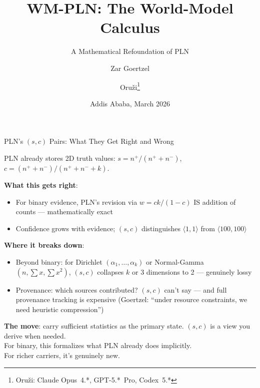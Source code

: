 \documentclass[aspectratio=169,11pt]{beamer}
\title{WM-PLN: The World-Model Calculus}
\subtitle{A Mathematical Refoundation of PLN}
\author{Zar Goertzel \and Oru\v{z}i\thanks{%
  Oru\v{z}i: Claude Opus~4.*, GPT-5.*~Pro, Codex~5.*}}
\institute{Hyperon AGI Community Meeting}
\date{Addis Ababa, March 2026}
\begin{document}
\begin{frame}
\titlepage
\end{frame}

\begin{frame}{PLN's $(s, c)$ Pairs: What They Get Right and Wrong}

PLN already stores 2D truth values: $s = n^+/(n^+ + n^-)$,
$c = (n^+ + n^-)/(n^+ + n^- + k)$.

\medskip
\textbf{What this gets right}:
\begin{itemize}
\item For binary evidence, PLN's revision via $w = ck/(1{-}c)$
      IS addition of counts --- mathematically exact
\item Confidence grows with evidence; $(s, c)$ distinguishes
      $\langle 1, 1 \rangle$ from $\langle 100, 100 \rangle$
\end{itemize}

\medskip
\textbf{Where it breaks down}:
\begin{itemize}
\item \alert{Beyond binary}: for Dirichlet $(\alpha_1, \ldots,
      \alpha_k)$ or Normal-Gamma $(n, \sum x, \sum x^2)$,
      $(s, c)$ collapses $k$ or 3 dimensions to 2 ---
      genuinely lossy
\item \alert{Provenance}: which sources contributed?
      $(s, c)$ can't say --- and full provenance tracking
      is expensive (Goertzel: ``under resource constraints,
      we need heuristic compression'')
\end{itemize}

\medskip
\begin{center}
\textbf{The move}: carry \alert{sufficient statistics} as
the primary state. $(s, c)$ is a view you derive when needed.\\
For binary, this formalizes what PLN already does implicitly.\\
For richer carriers, it's genuinely new.
\end{center}

\end{frame}
\end{document}

